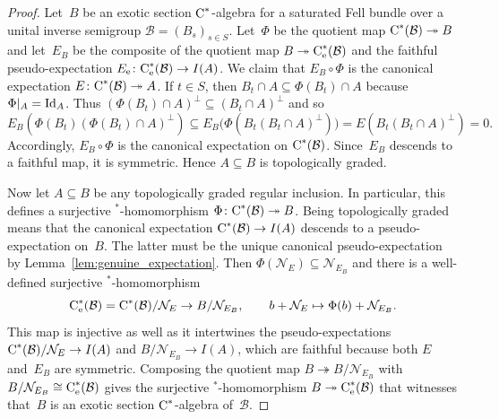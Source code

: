 \documentclass[a4paper]{amsart}
\theoremstyle{plain}
\theoremstyle{definition}
\theoremstyle{remark}
\newtheorem{remark}[theorem]{Remark}
\numberwithin{theorem}{section}
\numberwithin{equation}{section}
\newcommand*{\nb}{\nobreakdash}
\newcommand*{\Star}{\(^*\)\nobreakdash-}
\newcommand*{\Null}{\mathcal N}%
\newcommand*{\ess}{\mathrm{e}}%
\newcommand*{\Cst}{\textup C^*}%
\newcommand*{\Locmult}{\mathcal{M}_{\mathrm{loc}}}%
\newcommand*{\Slice}{\mathcal S}%
\newcommand*{\Id}{\textup{Id}}%
\newcommand*{\B}{\mathcal B}%
\newcommand*{\onto}{\twoheadrightarrow}
\begin{document}
\begin{proof}
  Let~\(B\) be an exotic section \(\Cst\)\nb-algebra for a saturated
  Fell bundle over a unital inverse semigroup \(\B=(B_{s})_{s\in S}\).
  Let~\(\Phi\) be the quotient map \(\Cst(\B) \onto B\) and
  let~\(E_B\) be the composite of the quotient map \(B\onto
  \Cst_\ess(\B)\) and the faithful pseudo-expectation \(E_\ess\colon
  \Cst_\ess(\B)\to I(A)\).
  We claim that \(E_B\circ \Phi\) is the canonical expectation
  \(E\colon \Cst(\B)\onto A\).
  If \(t\in S\), then \(B_t\cap A\subseteq \Phi(B_t)\cap A\) because
  \(\Phi|_A=\Id_A\).
  Thus \((\Phi(B_t)\cap A)^\bot \subseteq (B_t\cap A)^\bot\) and so
  \[
    E_B(\Phi(B_t)(\Phi(B_t)\cap A)^\bot)
    \subseteq E_B\bigl(\Phi(B_t(B_t\cap A)^\bot)\bigr)
    = E(B_t(B_t\cap A)^\bot)=0.
  \]
  Accordingly, \(E_B\circ\Phi\) is the canonical expectation on
  \(\Cst(\B)\).
  Since~\(E_B\) descends to a faithful map, it is symmetric.
  Hence \(A\subseteq B\) is topologically graded.

  Now let \(A\subseteq B\) be any topologically graded regular
  inclusion.
  In particular, this defines a surjective \Star{}homomorphism
  \(\Phi\colon\Cst(\B) \onto B\).
  Being topologically graded means that the canonical expectation
  \(\Cst(\B)\to I(A)\) descends to a pseudo-expectation on~\(B\).
  The latter must be the unique canonical pseudo-expectation by
  Lemma~\ref{lem:genuine_expectation}.
  Then \(\Phi(\Null_E)\subseteq \Null_{E_B}\) and there is a
  well-defined surjective \Star{}homomorphism
  \[
    \Cst_\ess(\B)= \Cst(\B)/\Null_E \to B/\Null_{E_B},
    \qquad
    b+\Null_E\mapsto \Phi(b)+\Null_{E_B}.
  \]
  This map is injective as well as it intertwines the
  pseudo-expectations \(\Cst(\B)/\Null_E\to I(A)\) and
  \(B/\Null_{E_B}\to I(A)\), which are faithful because both  \(E\)
  and~\(E_B\) are symmetric.
  Composing the quotient map \(B\onto B/\Null_{E_B}\) with
  \(B/\Null_{E_B}\cong \Cst_\ess(\B)\) gives the surjective
  \Star{}homomorphism \(B\onto \Cst_\ess(\B)\) that witnesses
  that~\(B\) is an exotic section \(\Cst\)\nb-algebra of~\(\B\).
\end{proof}

\end{document}
